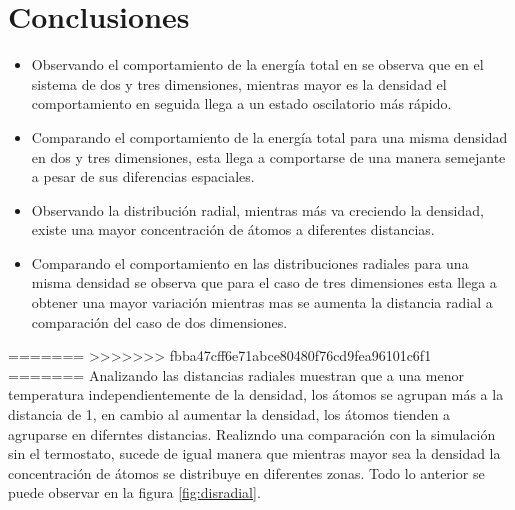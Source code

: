 \documentclass[reprint,amsmath,amssymb,aps,]{revtex4-2}
\begin{document}
\section{Conclusiones}
\begin{itemize}
    \item Observando el comportamiento de la energía total en se observa que en el sistema de dos y tres dimensiones, mientras mayor es la densidad el comportamiento en seguida llega a un estado oscilatorio más rápido.
    \item Comparando el comportamiento de la energía total para una misma densidad en dos y tres dimensiones, esta llega a comportarse de una manera semejante a pesar de sus diferencias espaciales.
    \item Observando la distribución  radial, mientras más va creciendo la densidad, existe una mayor concentración de átomos a diferentes distancias.
    \item Comparando el comportamiento en las distribuciones radiales para una misma densidad se observa que para el caso de tres dimensiones esta llega a obtener una mayor variación mientras mas se aumenta la distancia radial a comparación del caso de dos dimensiones.
\end{itemize}
=======
>>>>>>> fbba47cff6e71abce80480f76cd9fea96101c6f1
=======
Analizando las distancias radiales muestran que a una menor temperatura independientemente de la densidad, los átomos se agrupan más a la distancia de 1, en cambio
al aumentar la densidad, los átomos tienden a agruparse en diferntes distancias.
Realizndo una comparación con la simulación sin el termostato, sucede de igual manera que mientras mayor sea la densidad
la concentración de átomos se distribuye en diferentes zonas. Todo lo anterior se puede observar en la figura \ref{fig:disradial}.\\\\
\end{document}
